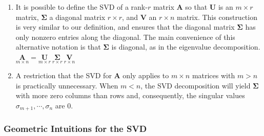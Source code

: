 \begin{enumerate}
    \item 
    \begin{definition}[Compact SVD/ Thin SVD/ Truncated SVD ($A = U\Sigma V$)]
        It is possible to define the SVD of a rank-$r$ matrix $\bm{A}$ so that $\bm{U}$ is an $m \times r$ matrix, $\bm{\Sigma}$ a diagonal matrix $r \times r$, and $\bm{V}$ an $r \times n$ matrix. 
        This construction is very similar to our definition, and ensures that the diagonal matrix $\bm{\Sigma}$ has only nonzero entries along the diagonal. 
        The main convenience of this alternative notation is that $\bm{\Sigma}$ is diagonal, as in the eigenvalue decomposition.
        \\
         $
            \underset{\displaystyle m\times n}{\bm{A}} = 
            \underset{\displaystyle m\times r}{\bm{U}}\ 
            \underset{\displaystyle r\times r}{\bm{\Sigma}}\ 
            \underset{\displaystyle r\times n}{\bm{V}}
        $
        \hfill \cite{mfml/book/mml/Deisenroth-Faisal-Ong}
    \end{definition}

    \item A restriction that the SVD for $\bm{A}$ only applies to $m \times n$ matrices with $m > n$ is practically unnecessary. 
    When $m < n$, the SVD decomposition will yield $\bm{\Sigma}$ with more zero columns than rows and, consequently, the singular values $\sigma _{m+1}, \cdots , \sigma _n$ are $0$.
    \hfill \cite{mfml/book/mml/Deisenroth-Faisal-Ong}
\end{enumerate}





\subsubsection{Geometric Intuitions for the SVD}

